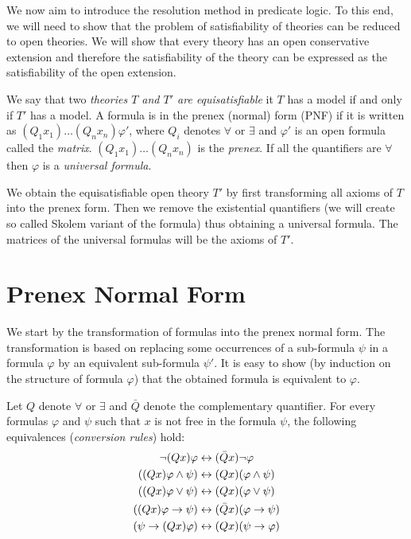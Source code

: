 We now aim to introduce the resolution method in predicate logic. To this end, we will need to show that the problem of satisfiability of theories can be reduced to open theories. We will show that every theory has an open conservative extension and therefore the satisfiability of the theory can be expressed as the satisfiability of the open extension. 

We say that two \emph{theories $T$ and $T'$ are equisatisfiable} it $T$ has a model if and only if $T'$ has a model. A formula is in the prenex (normal) form (PNF) if it is written as $(Q_1 x_1)\dots(Q_n x_n)\varphi'$, where $Q_i$ denotes $\forall$ or $\exists$ and $\varphi'$ is an open formula called the \emph{matrix}. $(Q_1 x_1)\dots(Q_n x_n)$ is the \emph{prenex}. If all the quantifiers are $\forall$ then $\varphi$ is a \emph{universal formula}.

We obtain the equisatisfiable open theory $T'$ by first transforming all axioms of $T$ into the prenex form. Then we remove the existential quantifiers (we will create so called Skolem variant of the formula) thus obtaining a universal formula. The matrices of the universal formulas will be the axioms of $T'$.

\section{Prenex Normal Form}

We start by the transformation of formulas into the prenex normal form. The transformation is based on replacing some occurrences of a sub-formula $\psi$ in a formula $\varphi$ by an equivalent sub-formula $\psi'$. It is easy to show (by induction on the structure of formula $\varphi$) that the obtained formula is equivalent to $\varphi$.

Let $Q$ denote $\forall$ or $\exists$ and $\bar{Q}$ denote the complementary quantifier. For every formulas $\varphi$ and $\psi$ such that $x$ is not free in the formula $\psi$, the following equivalences (\emph{conversion rules}) hold:
\begin{align*}
\neg(Qx)\varphi & \leftrightarrow (\bar{Q}x)\neg \varphi \\
((Qx)\varphi \land \psi) & \leftrightarrow (Qx)(\varphi \land \psi) \\
((Qx)\varphi \lor \psi) & \leftrightarrow (Qx)(\varphi \lor \psi) \\
((Qx)\varphi \to \psi) & \leftrightarrow (\bar{Q}x)(\varphi \to \psi) \\
(\psi \to (Qx) \varphi) & \leftrightarrow (Qx)(\psi \to \varphi)
\end{align*}

